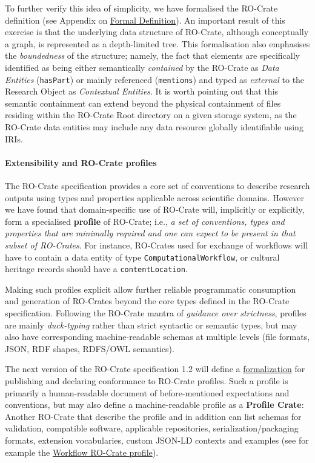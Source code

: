 {To further verify this idea of simplicity, we have formalised the
RO-Crate definition (see Appendix on
\protect\hyperlink{formaldefinition}{Formal Definition}). An important
result of this exercise is that the underlying data structure of
RO-Crate, although conceptually a graph, is represented as a
depth-limited tree. This formalisation also emphasises the
\emph{boundedness} of the structure; namely, the fact that elements are
specifically identified as being either semantically \emph{contained} by
the RO-Crate as \emph{Data Entities} (\texttt{hasPart}) or mainly
referenced (\texttt{mentions}) and typed as \emph{external} to the
Research Object as \emph{Contextual Entities}. It is worth pointing out
that this semantic containment can extend beyond the physical
containment of files residing within the RO-Crate Root directory on a
given storage system, as the RO-Crate data entities may include any data
resource globally identifiable using IRIs.

\hypertarget{profiles}{%
\paragraph{Extensibility and RO-Crate profiles}\label{profiles}}

The RO-Crate specification provides a core set of conventions to
describe research outputs using types and properties applicable across
scientific domains. However we have found that domain-specific use of
RO-Crate will, implicitly or explicitly, form a specialised
\textbf{profile} of RO-Crate; i.e., \emph{a set of conventions, types
and properties that are minimally required and one can expect to be
present in that subset of RO-Crates}. For instance, RO-Crates used for
exchange of workflows will have to contain a data entity of type
\texttt{ComputationalWorkflow}, or cultural heritage records should have
a \texttt{contentLocation}.

Making such profiles explicit allow further reliable programmatic
consumption and generation of RO-Crates beyond the core types defined in
the RO-Crate specification. Following the RO-Crate mantra of
\emph{guidance over strictness}, profiles are mainly \emph{duck-typing}
rather than strict syntactic or semantic types, but may also have
corresponding machine-readable schemas at multiple levels (file formats,
JSON, RDF shapes, RDFS/OWL semantics).

The next version of the RO-Crate specification 1.2 will define a
\href{https://www.researchobject.org/ro-crate/1.2-DRAFT/profiles}{formalization}
for publishing and declaring conformance to RO-Crate profiles. Such a
profile is primarily a human-readable document of before-mentioned
expectations and conventions, but may also define a machine-readable
profile as a \textbf{Profile Crate}: Another RO-Crate that describe the
profile and in addition can list schemas for validation, compatible
software, applicable repositories, serialization/packaging formats,
extension vocabularies, custom JSON-LD contexts and examples (see for
example the
\href{https://w3id.org/workflowhub/workflow-ro-crate/}{Workflow RO-Crate
profile}).

}
